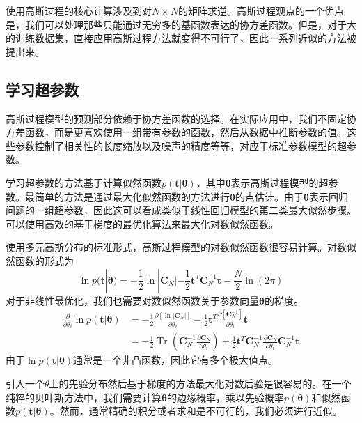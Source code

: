 使用高斯过程的核心计算涉及到对$N\times N$的矩阵求逆。高斯过程观点的一个优点是，我们可以处理那些只能通过无穷多的基函数表达的协方差函数。但是，对于大的训练数据集，直接应用高斯过程方法就变得不可行了，因此一系列近似的方法被提出来。
\subsection*{学习超参数}
高斯过程模型的预测部分依赖于协方差函数的选择。在实际应用中，我们不固定协方差函数，而是更喜欢使用一组带有参数的函数，然后从数据中推断参数的值。这些参数控制了相关性的长度缩放以及噪声的精度等等，对应于标准参数模型的超参数。

学习超参数的方法基于计算似然函数$p(\boldsymbol{t}|\boldsymbol{\theta})$，其中$\boldsymbol{\theta}$表示高斯过程模型的超参数。最简单的方法是通过最大化似然函数的方法进行$\boldsymbol{\theta}$的点估计。由于$\boldsymbol{\theta}$表示回归问题的一组超参数，因此这可以看成类似于线性回归模型的第二类最大似然步骤。可以使用高效的基于梯度的最优化算法来最大化对数似然函数。

使用多元高斯分布的标准形式，高斯过程模型的对数似然函数很容易计算。对数似然函数的形式为
\begin{equation}
	\ln p(\boldsymbol{t}|\boldsymbol{\theta})=-\frac{1}{2}\ln |\boldsymbol{C}_N|-\frac{1}{2}\boldsymbol{t}^T\boldsymbol{C}_N^{-1}\boldsymbol{t}-\frac{N}{2}\ln (2\pi)
\end{equation}
对于非线性最优化，我们也需要对数似然函数关于参数向量$\boldsymbol{\theta}$的梯度。
\begin{equation}
	\begin{aligned}
	\frac{\partial }{\partial \theta_i}\ln p(\boldsymbol{t}|\boldsymbol{\theta})&=-\frac{1}{2}\frac{\partial [\ln |\boldsymbol{C}_N|]}{\partial \theta_i}-\frac{1}{2}\boldsymbol{t}^T\frac{\partial [\boldsymbol{C}_N^{-1}]}{\partial \theta_i}\boldsymbol{t}\\
	&=-\frac{1}{2}\mathop{Tr}\left(\boldsymbol{C}_N^{-1}\frac{\partial \boldsymbol{C}_N}{\partial \theta_i} \right)+\frac{1}{2}\boldsymbol{t}^T\boldsymbol{C}_N^{-1}\frac{\partial \boldsymbol{C}_N}{\partial \theta_i}\boldsymbol{C}_N^{-1}\boldsymbol{t}
	\end{aligned}
\end{equation}
由于$\ln p(\boldsymbol{t}|\boldsymbol{\theta})$通常是一个非凸函数，因此它有多个极大值点。

引入一个$\theta$上的先验分布然后基于梯度的方法最大化对数后验是很容易的。在一个纯粹的贝叶斯方法中，我们需要计算$\boldsymbol{\theta}$的边缘概率，乘以先验概率$p(\boldsymbol{\theta})$和似然函数$p(\boldsymbol{t}|\boldsymbol{\theta})$。然而，通常精确的积分或者求和是不可行的，我们必须进行近似。
